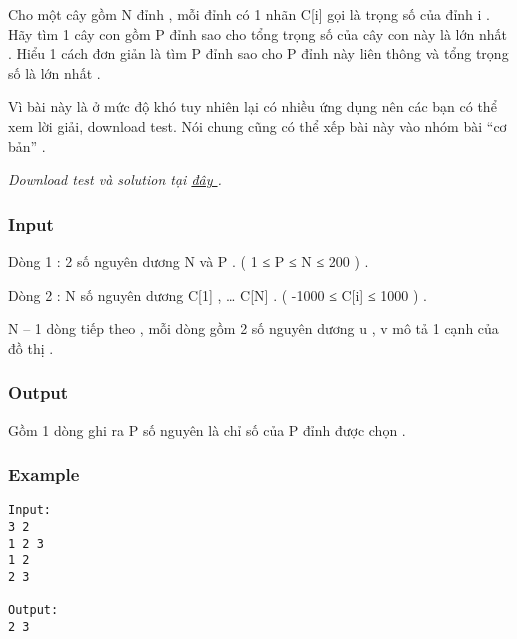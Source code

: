 



   Cho một cây gồm N đỉnh , mỗi đỉnh có 1 nhãn C[i] gọi là trọng số của đỉnh i . Hãy tìm 1 cây con gồm P đỉnh sao cho tổng trọng số của cây con này là lớn nhất . Hiểu 1 cách đơn giản là tìm P đỉnh sao cho P đỉnh này liên thông và tổng trọng số là lớn nhất .   





       Vì bài này là ở mức độ khó tuy nhiên lại có nhiều ứng dụng nên các bạn có thể xem lời giải, download test. Nói chung cũng có thể xếp bài này vào nhóm bài “cơ bản” .      





\textit{    Download test và solution tại    \href{http://vn.spoj.pl/content/ptree.rar}{     đây    }    .   }

\subsubsection{   Input  }

   Dòng 1 : 2 số nguyên dương N và P . ( 1 ≤ P ≤ N ≤ 200 ) .   


   Dòng 2 : N số nguyên dương C[1] , … C[N] . ( -1000 ≤ C[i] ≤ 1000 ) .   


   N – 1 dòng tiếp theo , mỗi dòng gồm 2 số nguyên dương u , v mô tả 1 cạnh của đồ thị .   




\subsubsection{   Output  }

   Gồm 1 dòng ghi ra P số nguyên là chỉ số của P đỉnh được chọn .  

\subsubsection{   Example  }
\begin{verbatim}
Input:
3 2
1 2 3
1 2
2 3

Output:
2 3
\end{verbatim}
